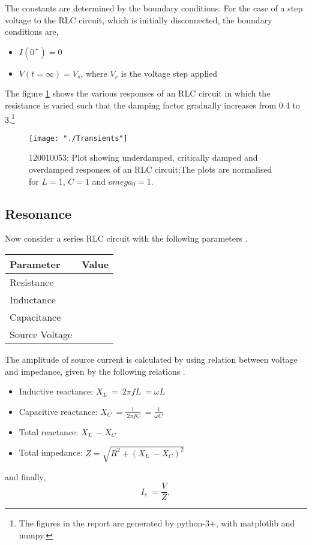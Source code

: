 \documentclass[12pt, twosides]{article}
\newcommand{\rollno}{120010053}
\newcommand{\voltage}{\ensuremath{V}}
\newcommand{\curr}{I}
\newcommand{\res}{R}
\newcommand{\capc}{C}
\newcommand{\ind}{L}
\newcommand{\react}{X}
\begin{document}
			\noindent
			The constants are determined by the boundary conditions. For the case of a step voltage to the RLC circuit, which is initially disconnected, the boundary conditions are,
			\begin{itemize}[leftmargin=*]
				\item \( \curr(0^+) = 0 \)
				\item \( \voltage(t=\infty) = \voltage_s\), 
				where \(\voltage_s\) is the voltage step applied
			\end{itemize}
			\noindent
			The figure \ref{fig:transients} shows the various responses of an RLC circuit in which the resistance is varied such that the damping factor gradually increases from 0.4 to 3.\footnote{The figures in the report are generated by python-3+, with matplotlib and numpy.}
			\begin{figure}[H]
			\centering
				\texttt{[image: "./Transients"]}
			\caption{\rollno: Plot showing underdamped, critically damped and overdamped responses of an RLC circuit;The plots are normalised for \(\ind = 1\), \(\capc = 1\) and \(omega_0 = 1\).}
			\label{fig:transients}
			\end{figure}
			
			
		\subsection{Resonance}	
			Now consider a series RLC circuit with the following parameters \cite{AllAbtCirc}.
			\begin{center}
			\begin{tabular}{|l|c|}
				\hline
				Parameter & Value\\ \hline
				Resistance & \serRes\\
				Inductance & \serInd\\
				Capacitance & \serCap\\
				Source Voltage & \serSource\\ \hline
			\end{tabular}
			\end{center}
		
			The amplitude of source current is calculated by using relation between voltage and impedance, given by the following relations \cite{ElecTut}.
			\begin{itemize}[label=\textbullet, leftmargin=*]
				\item Inductive reactance: \( \react_\ind \ = \ 2 \pi f \ind \ = \omega \ind \)
				\item Capacitive reactance: \( \react_\capc \ = \frac{1}{\ 2 \pi f \capc} \ = \frac{1}{\omega \capc} \)
				\item Total reactance: \( \react_\ind \ - \react_\capc\)
				\item Total impedance: \( Z = \sqrt{\res^2 + (\react_\ind \ - \react_\capc)^2} \)

			\end{itemize}			
			and finally,
			\[ \curr_s \ = \frac{\voltage}{Z},\]
	
\end{document}
